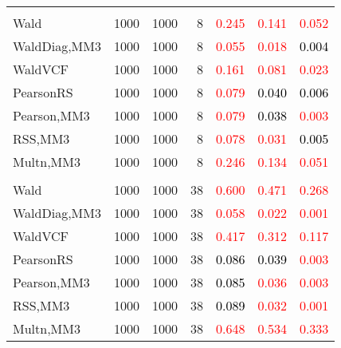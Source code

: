 \documentclass[
]{article}
\begin{document}
\begin{table}[H]
{\begin{tabular}[t]{lrrrrrr}
\addlinespace[0.3em]
\multicolumn{7}{l}{\textbf{2F 10V}}\\
\hspace{1em}Wald & 1000 & 1000 & 8 & \textcolor{red}{0.245} & \textcolor{red}{0.141} & \textcolor{red}{0.052}\\
\hspace{1em}WaldDiag,MM3 & 1000 & 1000 & 8 & \textcolor{red}{0.055} & \textcolor{red}{0.018} & \textcolor{black}{0.004}\\
\hspace{1em}WaldVCF & 1000 & 1000 & 8 & \textcolor{red}{0.161} & \textcolor{red}{0.081} & \textcolor{red}{0.023}\\
\hspace{1em}PearsonRS & 1000 & 1000 & 8 & \textcolor{red}{0.079} & \textcolor{black}{0.040} & \textcolor{black}{0.006}\\
\hspace{1em}Pearson,MM3 & 1000 & 1000 & 8 & \textcolor{red}{0.079} & \textcolor{black}{0.038} & \textcolor{red}{0.003}\\
\hspace{1em}RSS,MM3 & 1000 & 1000 & 8 & \textcolor{red}{0.078} & \textcolor{red}{0.031} & \textcolor{black}{0.005}\\
\hspace{1em}Multn,MM3 & 1000 & 1000 & 8 & \textcolor{red}{0.246} & \textcolor{red}{0.134} & \textcolor{red}{0.051}\\
\addlinespace[0.3em]
\multicolumn{7}{l}{\textbf{3F 15V}}\\
\hspace{1em}Wald & 1000 & 1000 & 38 & \textcolor{red}{0.600} & \textcolor{red}{0.471} & \textcolor{red}{0.268}\\
\hspace{1em}WaldDiag,MM3 & 1000 & 1000 & 38 & \textcolor{red}{0.058} & \textcolor{red}{0.022} & \textcolor{red}{0.001}\\
\hspace{1em}WaldVCF & 1000 & 1000 & 38 & \textcolor{red}{0.417} & \textcolor{red}{0.312} & \textcolor{red}{0.117}\\
\hspace{1em}PearsonRS & 1000 & 1000 & 38 & \textcolor{black}{0.086} & \textcolor{black}{0.039} & \textcolor{red}{0.003}\\
\hspace{1em}Pearson,MM3 & 1000 & 1000 & 38 & \textcolor{black}{0.085} & \textcolor{red}{0.036} & \textcolor{red}{0.003}\\
\hspace{1em}RSS,MM3 & 1000 & 1000 & 38 & \textcolor{black}{0.089} & \textcolor{red}{0.032} & \textcolor{red}{0.001}\\
\hspace{1em}Multn,MM3 & 1000 & 1000 & 38 & \textcolor{red}{0.648} & \textcolor{red}{0.534} & \textcolor{red}{0.333}\\
\bottomrule
\end{tabular}}
\endgroup{}
\end{table}
\end{document}
